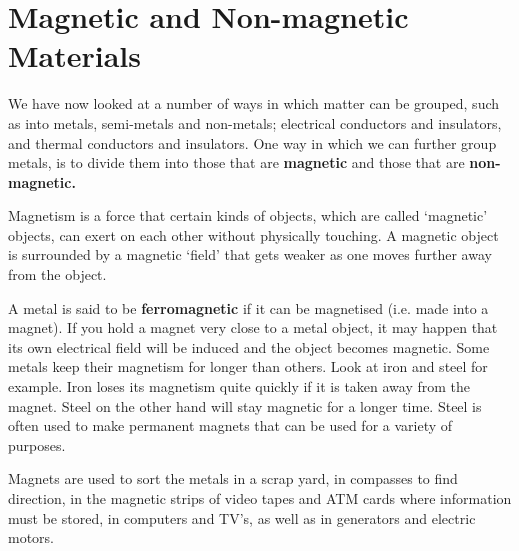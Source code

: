             \section{Magnetic and Non-magnetic Materials}
            \nopagebreak
      \label{m38706*id67151}We have now looked at a number of ways in which matter can be grouped, such as into metals, semi-metals and non-metals; electrical conductors and insulators, and thermal conductors and insulators. One way in which we can further group metals, is to divide them into those that are \textbf{magnetic} and those that are \textbf{non-magnetic.}\par 
\par
\Definition{   \label{id2410309} { Magnetism }} { \label{m38706*meaningfhsst!!!underscore!!!id570}
      \label{m38706*id67174}Magnetism is a force that certain kinds of objects, which are called `magnetic' objects, can exert on each other without physically touching. A magnetic object is surrounded by a magnetic `field' that gets weaker as one moves further away from the object. \par 
       } 
\begin{minipage}{.5\textwidth}
      \label{m38706*id67186}A metal is said to be \textbf{ferromagnetic} if it can be magnetised (i.e. made into a magnet). If you hold a magnet very close to a metal object, it may happen that its own electrical field will be induced and the object becomes magnetic. Some metals keep their magnetism for longer than others. Look at iron and steel for example. Iron loses its magnetism quite quickly if it is taken away from the magnet. Steel on the other hand will stay magnetic for a longer time. Steel is often used to make permanent magnets that can be used for a variety of purposes.\par 
      \label{m38706*id67200}Magnets are used to sort the metals in a scrap yard, in compasses to find direction, in the magnetic strips of video tapes and ATM cards where information must be stored, in computers and TV's, as well as in generators and electric motors.\par 
\end{minipage}
